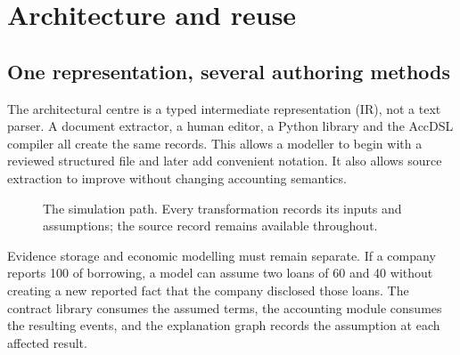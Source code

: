 \chapter{Architecture and reuse}
\label{ch:architecture}

\section{One representation, several authoring methods}

The architectural centre is a typed intermediate representation (IR), not a
text parser. A document extractor, a human editor, a Python library and the
AccDSL compiler all create the same records. This allows a modeller to begin
with a reviewed structured file and later add convenient notation. It also
allows source extraction to improve without changing accounting semantics.

\begin{figure}[ht]
\centering
{}
\caption{The simulation path. Every transformation records its inputs and
assumptions; the source record remains available throughout.}
\label{fig:architecture}
\end{figure}

Evidence storage and economic modelling must remain separate. If a company
reports 100 of borrowing, a model can assume two loans of 60 and 40 without
creating a new reported fact that the company disclosed those loans. The
contract library consumes the assumed terms, the accounting module consumes
the resulting events, and the explanation graph records the assumption at
each affected result.

